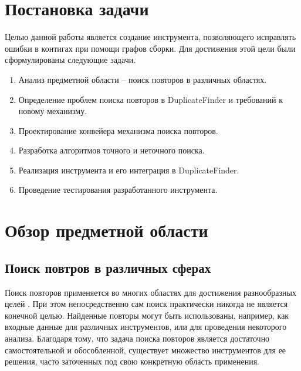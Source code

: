 \documentclass[14pt]{matmex-diploma-custom}
\begin{document}
\section{Постановка задачи}
Целью данной работы является создание инструмента, позволяющего исправлять ошибки в контигах при помощи графов сборки. Для достижения этой цели были сформулированы следующие задачи.
\begin{enumerate}
	\item Анализ предметной области -- поиск повторов в различных областях.
	\item Определение проблем поиска повторов в DuplicateFinder и требований к новому механизму.
	\item Проектирование конвейера механизма поиска повторов.
	\item Разработка алгоритмов точного и неточного поиска.
	\item Реализация инструмента и его интеграция в DuplicateFinder.
	\item Проведение тестирования разработанного инструмента.
\end{enumerate}

\section{Обзор предметной области}
\subsection{Поиск повтров в различных сферах}
Поиск повторов применяется во многих областях для достижения разнообразных целей \cite{bib:art:NearDupSurvey}. При этом непосредственно сам поиск практически никогда не является конечной целью. Найденные повторы могут быть использованы, например, как входные данные для различных инструментов, или для проведения некоторого анализа. Благодаря тому, что задача поиска повторов является достаточно самостоятельной и обособленной, существует множество инструментов для ее решения, часто заточенных под свою конкретную область применения.
\end{document}
